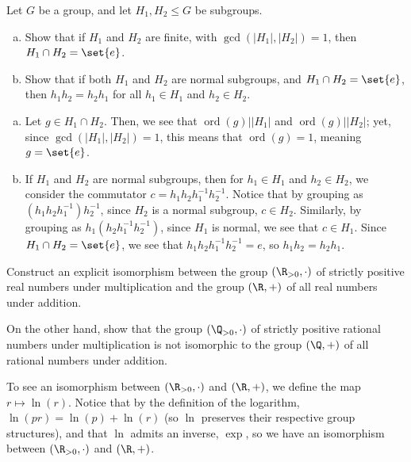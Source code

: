 \documentclass[10pt]{mypackage}
\begin{document}
\begin{problem}[Problem 3]
  Let $G$ be a group, and let $H_1,H_2\leq G$ be subgroups.
  \begin{enumerate}[(a)]
    \item Show that if $H_1$ and $H_2$ are finite, with $\gcd\left(\left\vert H_1 \right\vert,\left\vert H_2 \right\vert\right) = 1$, then $H_1\cap H_2 = \set{e}$.
    \item Show that if both $H_1$ and $H_2$ are normal subgroups, and $H_1\cap H_2 = \set{e}$, then $h_1h_2 = h_2h_1$ for all $h_1\in H_1$ and $h_2\in H_2$.
  \end{enumerate}
\end{problem}
\begin{solution}\hfill
  \begin{enumerate}[(a)]
    \item Let $g\in H_1\cap H_2$. Then, we see that $\operatorname{ord}\left( g \right) | \left\vert H_1 \right\vert$ and $\operatorname{ord}\left( g \right) | \left\vert H_2 \right\vert$; yet, since $\gcd\left( \left\vert H_1 \right\vert,\left\vert H_2 \right\vert \right) = 1$, this means that $\operatorname{ord}\left( g \right) = 1$, meaning $g = \set{e}$.
    \item If $H_1$ and $H_2$ are normal subgroups, then for $h_1\in H_1$ and $h_2\in H_2$, we consider the commutator $c = h_1h_2h_1^{-1}h_2^{-1}$. Notice that by grouping as $\left( h_1h_2h_1^{-1} \right)h_2^{-1}$, since $H_2$ is a normal subgroup, $c\in H_2$. Similarly, by grouping as $h_1\left( h_2h_1^{-1}h_2^{-1} \right)$, since $H_1$ is normal, we see that $c\in H_1$. Since $H_1\cap H_2 = \set{e}$, we see that $h_1h_2h_1^{-1}h_2^{-1} = e$, so $h_1h_2 = h_2h_1$.
  \end{enumerate}
\end{solution}
\begin{problem}[Problem 8]
  Construct an explicit isomorphism between the group $\left( \R_{> 0},\cdot \right)$ of strictly positive real numbers under multiplication and the group $\left( \R,+ \right)$ of all real numbers under addition.\newline

  On the other hand, show that the group $\left( \Q_{ > 0 },\cdot \right)$ of strictly positive rational numbers under multiplication is not isomorphic to the group $\left( \Q,+ \right)$ of all rational numbers under addition.
\end{problem}
\begin{solution}
  To see an isomorphism between $\left( \R_{ > 0 },\cdot \right)$ and $\left( \R,+ \right)$, we define the map $r\mapsto \ln\left( r \right)$. Notice that by the definition of the logarithm, $\ln\left( pr \right) = \ln\left( p \right) + \ln\left( r \right)$ (so $\ln$ preserves their respective group structures), and that $\ln$ admits an inverse, $\exp$, so we have an isomorphism between $\left( \R_{ > 0 },\cdot \right)$ and $\left( \R,+ \right)$.
\end{solution}
\end{document}
